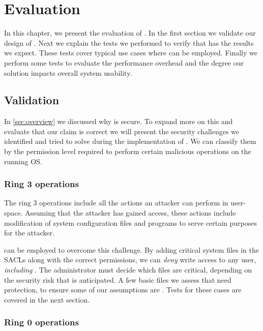 \acresetall
\chapter{Evaluation}\label{ch:chapter4}

In this chapter, we present the evaluation of . In the first section we validate our design of . Next we explain the tests we performed to verify that  has the results we expect. These tests cover typical use cases where  can be employed. Finally we perform some tests to evaluate the performance overhead and the degree our solution impacts overall system usability.

\section{Validation}\label{sec:validation}

\par In \ref{sec:overview} we discussed why  is secure. To expand more on this and evaluate that our claim is correct we will present the security challenges we identified and tried to solve during the implementation of . We can classify them by the permission level required to perform certain malicious operations on the running \ac{OS}. 

\subsection{Ring 3 operations}

\par The ring 3 operations include all the actions an attacker can perform in user-space. Assuming that the attacker has gained  access, these actions include modification of system configuration files and programs to serve certain purposes for the attacker. 
\par {} can be employed to overcome this challenge. By adding critical system files in the \acp{SACL} along with the correct permissions, we can \emph{deny} write access to any user, \emph{including} . The administrator must decide which files are critical, depending on the security risk that is anticipated. A few basic files we assess that need protection, to ensure some of our assumptions are . Tests for these cases are covered in the next section.

\subsection{Ring 0 operations}

